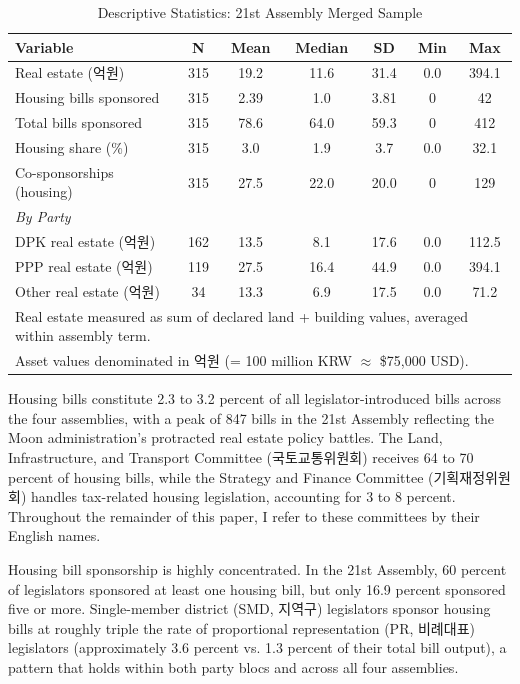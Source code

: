 \documentclass[11pt]{article}
\begin{document}
\begin{table}[htbp]
\centering
\caption{Descriptive Statistics: 21st Assembly Merged Sample}
\label{tab:desc}
\begin{tabular}{lcccccc}
\toprule
Variable & N & Mean & Median & SD & Min & Max \\
\midrule
Real estate (억원) & 315 & 19.2 & 11.6 & 31.4 & 0.0 & 394.1 \\
Housing bills sponsored & 315 & 2.39 & 1.0 & 3.81 & 0 & 42 \\
Total bills sponsored & 315 & 78.6 & 64.0 & 59.3 & 0 & 412 \\
Housing share (\%) & 315 & 3.0 & 1.9 & 3.7 & 0.0 & 32.1 \\
Co-sponsorships (housing) & 315 & 27.5 & 22.0 & 20.0 & 0 & 129 \\
\midrule
\multicolumn{7}{l}{\textit{By Party}} \\
\quad DPK real estate (억원) & 162 & 13.5 & 8.1 & 17.6 & 0.0 & 112.5 \\
\quad PPP real estate (억원) & 119 & 27.5 & 16.4 & 44.9 & 0.0 & 394.1 \\
\quad Other real estate (억원) & 34 & 13.3 & 6.9 & 17.5 & 0.0 & 71.2 \\
\bottomrule
\multicolumn{7}{l}{\footnotesize Real estate measured as sum of declared land + building values, averaged within assembly term.} \\
\multicolumn{7}{l}{\footnotesize Asset values denominated in 억원 (= 100 million KRW $\approx$ \$75,000 USD).} \\
\end{tabular}
\end{table}

Housing bills constitute 2.3 to 3.2 percent of all legislator-introduced bills across the four assemblies, with a peak of 847 bills in the 21st Assembly reflecting the Moon administration's protracted real estate policy battles. The Land, Infrastructure, and Transport Committee (국토교통위원회) receives 64 to 70 percent of housing bills, while the Strategy and Finance Committee (기획재정위원회) handles tax-related housing legislation, accounting for 3 to 8 percent. Throughout the remainder of this paper, I refer to these committees by their English names.

Housing bill sponsorship is highly concentrated. In the 21st Assembly, 60 percent of legislators sponsored at least one housing bill, but only 16.9 percent sponsored five or more. Single-member district (SMD, 지역구) legislators sponsor housing bills at roughly triple the rate of proportional representation (PR, 비례대표) legislators (approximately 3.6 percent vs. 1.3 percent of their total bill output), a pattern that holds within both party blocs and across all four assemblies.
\end{document}
